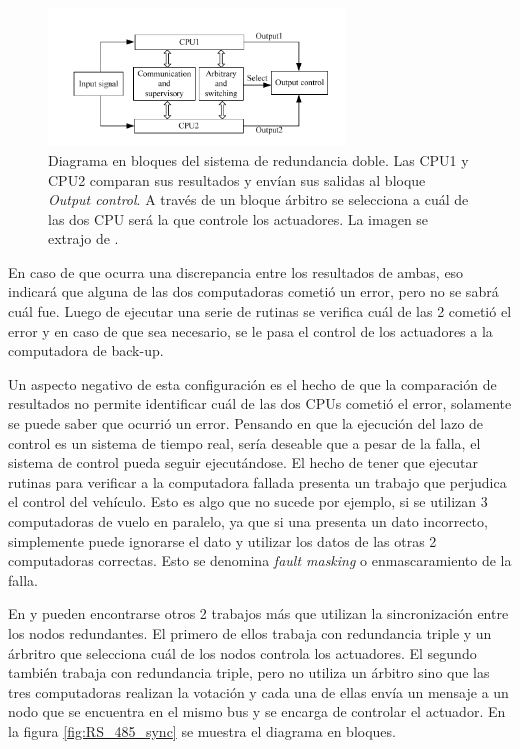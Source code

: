 \begin{figure}[H]
    \centering
    \includegraphics[width=0.7\textwidth]{img/FCC_dual_FPGA.png}
    \caption{Diagrama en bloques del sistema de redundancia doble. Las CPU1 y CPU2 comparan sus resultados y envían sus salidas al bloque \textit{Output control}. A través de un bloque árbitro se selecciona a cuál de las dos CPU será la que controle los actuadores. La imagen se extrajo de \cite{zhang2015dual}.}
    \label{fig:FCC_dual_FPGA}
\end{figure}

En caso de que ocurra una discrepancia entre los resultados de ambas, eso indicará que alguna de las dos computadoras cometió un error, pero no se sabrá cuál fue. Luego de ejecutar una serie de rutinas se verifica cuál de las 2 cometió el error y en caso de que sea necesario, se le pasa el control de los actuadores a la computadora de back-up.

Un aspecto negativo de esta configuración es el hecho de que la comparación de resultados no permite identificar cuál de las dos CPUs cometió el error, solamente se puede saber que ocurrió un error. Pensando en que la ejecución del lazo de control es un sistema de tiempo real, sería deseable que a pesar de la falla, el sistema de control pueda seguir ejecutándose. El hecho de tener que ejecutar rutinas para verificar a la computadora fallada presenta un trabajo que perjudica el control del vehículo. Esto es algo que no sucede por ejemplo, si se utilizan 3 computadoras de vuelo en paralelo, ya que si una presenta un dato incorrecto, simplemente puede ignorarse el dato y utilizar los datos de las otras 2 computadoras correctas. Esto se denomina \textit{fault masking} o enmascaramiento de la falla.

En \cite{chen2015design} y \cite{wang2008development} pueden encontrarse otros 2 trabajos más que utilizan la sincronización entre los nodos redundantes. El primero de ellos trabaja con redundancia triple y un árbritro que selecciona cuál de los nodos controla los actuadores. El segundo también trabaja con redundancia triple, pero no utiliza un árbitro sino que las tres computadoras realizan la votación y cada una de ellas envía un mensaje a un nodo que se encuentra en el mismo bus y se encarga de controlar el actuador. En la figura \ref{fig:RS_485_sync} se muestra el diagrama en bloques.

